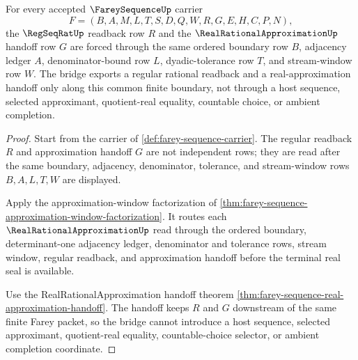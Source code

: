 \begin{theorem}
\label{thm:farey-sequence-regular-readback-approximation-bridge}
For every accepted $\FareySequenceUp$ carrier
$$
F=(B,A,M,L,T,S,D,Q,W,R,G,E,H,C,P,N),
$$
the $\RegSeqRatUp$ readback row $R$ and the $\RealRationalApproximationUp$ handoff row $G$ are forced through the same ordered boundary row $B$, adjacency ledger $A$, denominator-bound row $L$, dyadic-tolerance row $T$, and stream-window row $W$. The bridge exports a regular rational readback and a real-approximation handoff only along this common finite boundary, not through a host sequence, selected approximant, quotient-real equality, countable choice, or ambient completion.
\end{theorem}
\begin{proof}
Start from the carrier of \autoref{def:farey-sequence-carrier}. The regular readback $R$ and approximation handoff $G$ are not independent rows; they are read after the same boundary, adjacency, denominator, tolerance, and stream-window rows $B,A,L,T,W$ are displayed.

Apply the approximation-window factorization of \autoref{thm:farey-sequence-approximation-window-factorization}. It routes each $\RealRationalApproximationUp$ read through the ordered boundary, determinant-one adjacency ledger, denominator and tolerance rows, stream window, regular readback, and approximation handoff before the terminal real seal is available.

Use the RealRationalApproximation handoff theorem \autoref{thm:farey-sequence-real-approximation-handoff}. The handoff keeps $R$ and $G$ downstream of the same finite Farey packet, so the bridge cannot introduce a host sequence, selected approximant, quotient-real equality, countable-choice selector, or ambient completion coordinate.
\end{proof}
